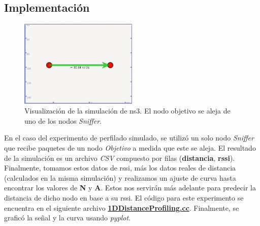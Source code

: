 \subsection{Implementación}
\begin{figure}[!htb]
\centering
\includegraphics[width=0.5\textwidth]{Figuras/profiling/simulation/profiling_pyvis_going_away2.jpg}
\captionsetup{margin=2cm}
\caption[Visualización de la simulacion de NS3. El nodo objetivo se aleja del nodo Sniffer.]{Visualización de la simulación de \acs{ns3}. El nodo objetivo se aleja de uno de los nodos \textit{Sniffer}.}
\label{fig:simulated-ns3-profiling}
\end{figure}
En el caso del experimento de perfilado simulado, se utilizó un solo nodo \textit{Sniffer} que recibe paquetes de un nodo \textit{Objetivo} a medida que este se aleja. El resultado de la simulación es un archivo \textit{CSV} compuesto por filas (\textbf{distancia}, \textbf{rssi}). Finalmente, tomamos estos datos de \acs{rssi}, más los datos reales de distancia (calculados en la misma simulación) y realizamos un ajuste de curva hasta encontrar los valores de \textbf{N} y \textbf{A}. Estos nos servirán más adelante para predecir la distancia de dicho nodo en base a su \acs{rssi}.
El código para este experimento se encuentra en el siguiente archivo \href{https://github.com/agusalex/ns3-rssi-trilateration/blob/main/src/1DDistanceProfiling.cc}{\textbf{1DDistanceProfiling.cc}}.
Finalmente, se graficó la señal y la curva usando \textit{pyplot}.
